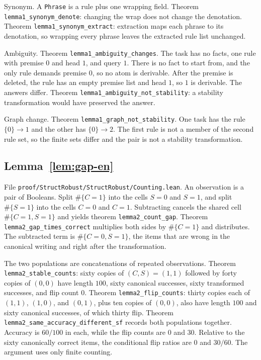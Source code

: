 \documentclass[11pt,a4paper]{article}
\theoremstyle{plain}
\begin{document}
Synonym. A \texttt{Phrase} is a rule plus one wrapping field. Theorem
\texttt{lemma1\_synonym\_denote}: changing the wrap does not change the
denotation. Theorem \texttt{lemma1\_synonym\_extract}: extraction maps each
phrase to its denotation, so wrapping every phrase leaves the extracted rule
list unchanged.

Ambiguity. Theorem \texttt{lemma1\_ambiguity\_changes}. The task has no facts,
one rule with premise $0$ and head $1$, and query $1$. There is no fact to
start from, and the only rule demands premise $0$, so no atom is derivable.
After the premise is deleted, the rule has an empty premise list and head $1$,
so $1$ is derivable. The answers differ. Theorem
\texttt{lemma1\_ambiguity\_not\_stability}: a stability transformation would
have preserved the answer.

Graph change. Theorem \texttt{lemma1\_graph\_not\_stability}. One task has the
rule $\{0\}\to 1$ and the other has $\{0\}\to 2$. The first rule is not a
member of the second rule set, so the finite sets differ and the pair is not a
stability transformation.

\subsection{Lemma~\ref{lem:gap-en}}

File \texttt{proof/StructRobust/StructRobust/Counting.lean}. An observation is
a pair of Booleans. Split $\#\{C=1\}$ into the cells $S=0$ and $S=1$, and split
$\#\{S=1\}$ into the cells $C=0$ and $C=1$. Subtracting cancels the shared cell
$\#\{C=1,S=1\}$ and yields theorem \texttt{lemma2\_count\_gap}. Theorem
\texttt{lemma2\_gap\_times\_correct} multiplies both sides by $\#\{C=1\}$ and
distributes. The subtracted term is $\#\{C=0,S=1\}$, the items that are wrong
in the canonical writing and right after the transformation.

The two populations are concatenations of repeated observations. Theorem
\texttt{lemma2\_stable\_counts}: sixty copies of $(C,S)=(1,1)$ followed by
forty copies of $(0,0)$ have length $100$, sixty canonical successes, sixty
transformed successes, and flip count $0$. Theorem
\texttt{lemma2\_flip\_counts}: thirty copies each of $(1,1)$, $(1,0)$, and
$(0,1)$, plus ten copies of $(0,0)$, also have length $100$ and sixty canonical
successes, of which thirty flip. Theorem
\texttt{lemma2\_same\_accuracy\_different\_sf} records both populations
together. Accuracy is $60/100$ in each, while the flip counts are $0$ and
$30$. Relative to the sixty canonically correct items, the conditional flip
ratios are $0$ and $30/60$. The argument uses only finite counting.
\end{document}
